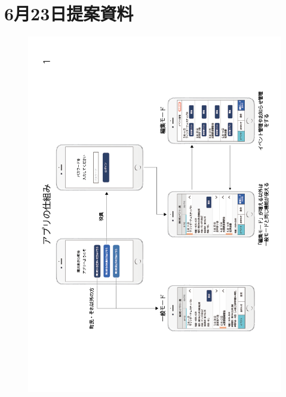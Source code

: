 \chapter{6月23日提案資料}
\begin{figure}[ht]
    \begin{center}
      \includegraphics[keepaspectratio, scale=0.65]{appendixs/appendixB_figres/fig1.png}
    \end{center}
\end{figure}

